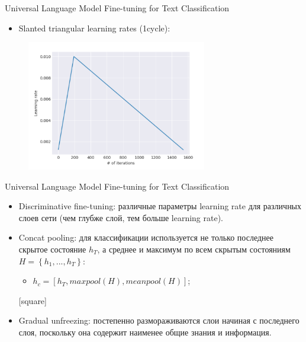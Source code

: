 \begin{frame}[c]{Universal Language Model Fine-tuning for Text Classification}
\begin{itemize}
	[square]
	\item Slanted triangular learning rates (1cycle):
\end{itemize}
\begin{figure}
	\centering
	\includegraphics[width=0.7\textwidth]{figures/1cycle.png}
\end{figure}
\end{frame}

\begin{frame}[c]{Universal Language Model Fine-tuning for Text Classification}
\begin{itemize}
	[square]
	\item Discriminative fine-tuning: различные параметры learning rate для различных слоев сети (чем глубже слой, тем больше learning rate).
	\item Concat pooling: для классификации используется не только последнее скрытое состояние $h_T$, а среднее и максимум по всем скрытым состояниям $H = \left\{h_1, . . . , h_T\right\}$:
	\begin{itemize}
		[circle]
		\item $h_c = \left[h_T, maxpool(H), meanpool(H)\right]$;
	\end{itemize}
	[square]
	\item Gradual unfreezing: постепенно размораживаются слои начиная с последнего слоя, поскольку она содержит наименее общие знания и информация.
\end{itemize}
\end{frame}

